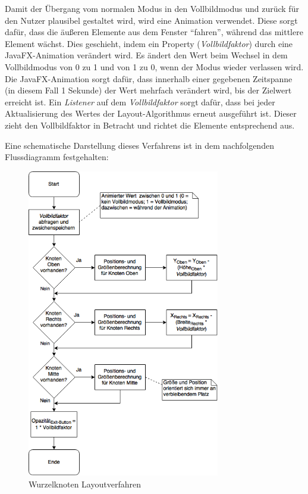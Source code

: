 Damit der Übergang vom normalen Modus in den Vollbildmodus und zurück für den Nutzer plausibel gestaltet wird, wird eine Animation verwendet. Diese sorgt dafür, dass die äußeren Elemente aus dem Fenster \enquote{fahren}, während das mittlere Element wächst. Dies geschieht, indem ein Property (\textit{Vollbildfaktor}) durch eine JavaFX-Animation verändert wird. Es ändert den Wert beim Wechsel in dem Vollbildmodus von 0 zu 1 und von 1 zu 0, wenn der Modus wieder verlassen wird. Die JavaFX-Animation sorgt dafür, dass innerhalb einer gegebenen Zeitspanne (in diesem Fall 1 Sekunde) der Wert mehrfach verändert wird, bis der Zielwert erreicht ist. Ein \textit{Listener} auf dem \textit{Vollbildfaktor} sorgt dafür, dass bei jeder Aktualisierung des Wertes der Layout-Algorithmus erneut ausgeführt ist. Dieser zieht den Vollbildfaktor in Betracht und richtet die Elemente entsprechend aus.\par
Eine schematische Darstellung dieses Verfahrens ist in dem nachfolgenden Flussdiagramm festgehalten:
\begin{figure}[H]
 \centering
 \includegraphics[width=0.75\textwidth]{grafiken/root_node_layout.png}
 \caption{Wurzelknoten Layoutverfahren}
 \label{fig:rootNodeLayout}
\end{figure}
